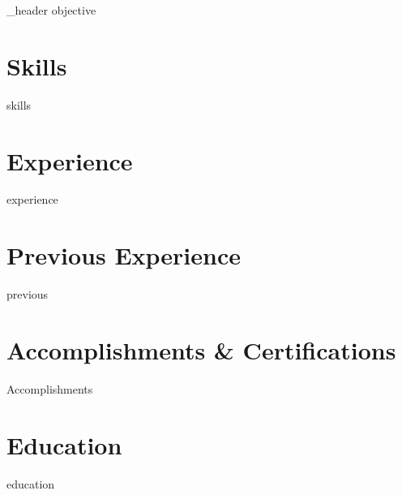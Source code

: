 \documentclass[11pt]{article}
\author{Alex Rivera}
\begin{document}
{_header}
{objective}


\section{Skills}{skills}

\section{Experience}
{experience}

\section{Previous Experience}
{previous}

\section{Accomplishments \& Certifications}
{Accomplishments}

\section{Education}
{education}
\end{document}
